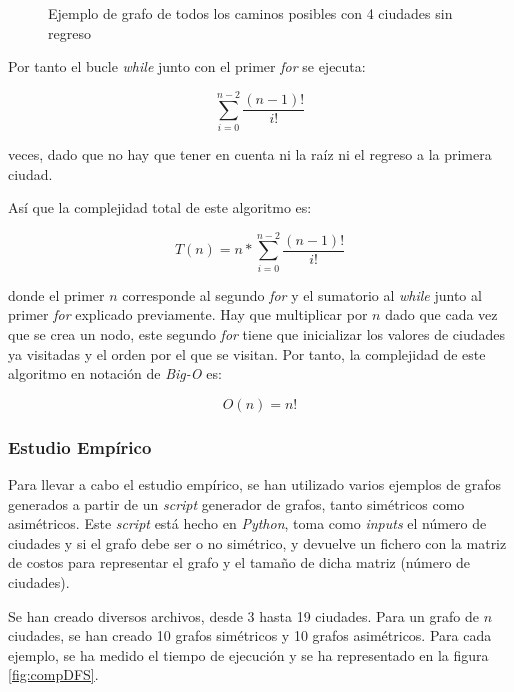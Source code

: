 \documentclass{uc3mpracticas}
\begin{document}
  \begin{figure}[!h]
    \caption{Ejemplo de grafo de todos los caminos posibles con 4 ciudades sin regreso}
    \label{fig:ejemploCaminos}
  \end{figure}


  Por tanto el bucle \textit{while} junto con el primer \textit{for} se ejecuta:

  $$ \displaystyle\sum_{i=0}^{n-2} \frac{(n-1)!}{i!} $$

  veces, dado que no hay que tener en cuenta ni la raíz ni el regreso a la primera ciudad.

  \vspace{2mm}

  Así que la complejidad total de este algoritmo es:

  $$ T(n) = n * \displaystyle\sum_{i=0}^{n-2} \frac{(n-1)!}{i!} $$

  donde el primer $n$ corresponde al segundo \textit{for} y el sumatorio al \textit{while} junto al primer \textit{for} explicado previamente. Hay que multiplicar por $n$ dado que cada vez que se crea un nodo, este segundo \textit{for} tiene que inicializar los valores de ciudades ya visitadas y el orden por el que se visitan. Por tanto, la complejidad de este algoritmo en notación de \textit{Big-O} es:

  $$ O(n) = n! $$


  \subsubsection{Estudio Empírico}

  Para llevar a cabo el estudio empírico, se han utilizado varios ejemplos de grafos generados a partir de un \textit{script} generador de grafos, tanto simétricos como asimétricos. Este \textit{script} está hecho en \textit{Python}, toma como \textit{inputs} el número de ciudades y si el grafo debe ser o no simétrico, y devuelve un fichero con la matriz de costos para representar el grafo y el tamaño de dicha matriz (número de ciudades).

  \vspace{2mm}

  Se han creado diversos archivos, desde 3 hasta 19 ciudades. Para un grafo de $n$ ciudades, se han creado 10 grafos simétricos y 10 grafos asimétricos. Para cada ejemplo, se ha medido el tiempo de ejecución y se ha representado en la figura \ref{fig:compDFS}.

  \vspace{2mm}
\end{document}
